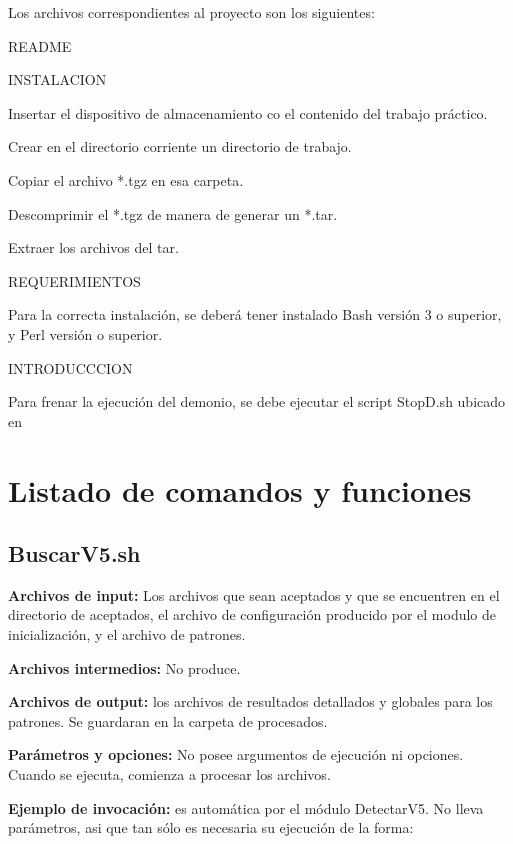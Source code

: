 \documentclass[a4paper,12pt]{article}
\begin{document}
Los archivos correspondientes al proyecto son los siguientes:

README

INSTALACION

Insertar el dispositivo de almacenamiento co el contenido del trabajo práctico.

Crear en el directorio corriente un directorio de trabajo.

Copiar el archivo *.tgz en esa carpeta.

Descomprimir el *.tgz de manera de generar un *.tar.

Extraer los archivos del tar.


REQUERIMIENTOS

Para la correcta instalación, se deberá tener instalado Bash versión 3 o superior, y Perl versión  o superior.


INTRODUCCCION



Para frenar la ejecución del demonio, se debe ejecutar el script StopD.sh ubicado en %

\section{Listado de comandos y funciones}

\subsection{ BuscarV5.sh }

{\bf Archivos de input:} Los archivos que sean aceptados y que se encuentren en el directorio de aceptados, el archivo de configuración producido por el modulo de inicialización, y el archivo de patrones.

{\bf Archivos intermedios:} No produce.

{\bf Archivos de output:} los archivos de resultados detallados y globales para los patrones. Se guardaran en la carpeta de procesados.

{\bf Parámetros y opciones:} No posee argumentos de ejecución ni opciones. Cuando se ejecuta, comienza a procesar los archivos.

{\bf Ejemplo de invocación:} es automática por el módulo DetectarV5. No lleva parámetros, asi que tan sólo es necesaria su ejecución de la forma:
\end{document}
